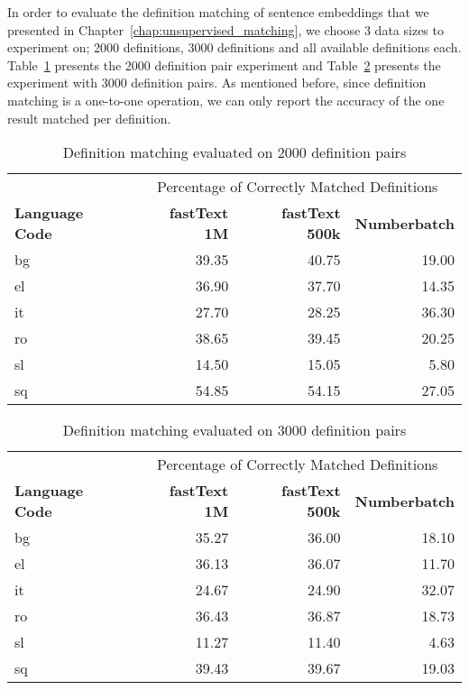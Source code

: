 In order to evaluate the definition matching of sentence embeddings that we presented in Chapter~\ref{chap:unsupervised_matching}, we choose 3 data sizes to experiment on; 2000 definitions, 3000 definitions and all available definitions each.
Table~\ref{tab:lapjv_2000} presents the 2000 definition pair experiment and Table~\ref{tab:lapjv_3000} presents the experiment with 3000 definition pairs.
As mentioned before, since definition matching is a one-to-one operation, we can only report the accuracy of the one result matched per definition.


\begin{table}[htbp]
    \centering
    \begin{tabular}{lrrr}
        \toprule
& \multicolumn{3}{c}{Percentage of Correctly Matched Definitions} \\
\cmidrule(lr){2-4}
        \textbf{Language Code} & \textbf{fastText 1M} & \textbf{fastText 500k} & \textbf{Numberbatch} \\
        \midrule
        bg & 39.35 & 40.75 & 19.00 \\
        el & 36.90 & 37.70 & 14.35 \\
        it & 27.70 & 28.25 & 36.30 \\
        ro & 38.65 & 39.45 & 20.25 \\
        sl & 14.50 & 15.05 & 5.80 \\
        sq & 54.85 & 54.15 & 27.05 \\
        \bottomrule
    \end{tabular}
    \caption{Definition matching evaluated on 2000 definition pairs}%
    \label{tab:lapjv_2000}
\end{table}

\begin{table}[htbp]
    \centering
    \begin{tabular}{lrrr}
        \toprule
& \multicolumn{3}{c}{Percentage of Correctly Matched Definitions} \\
\cmidrule(lr){2-4}
        \textbf{Language Code} & \textbf{fastText 1M} & \textbf{fastText 500k} & \textbf{Numberbatch} \\
        \midrule
        bg & 35.27 & 36.00 & 18.10 \\
        el & 36.13 & 36.07 & 11.70 \\
        it & 24.67 & 24.90 & 32.07 \\
        ro & 36.43 & 36.87 & 18.73 \\
        sl & 11.27 & 11.40 & 4.63 \\
        sq & 39.43 & 39.67 & 19.03 \\
        \bottomrule
    \end{tabular}
    \caption{Definition matching evaluated on 3000 definition pairs}%
    \label{tab:lapjv_3000}
\end{table}

